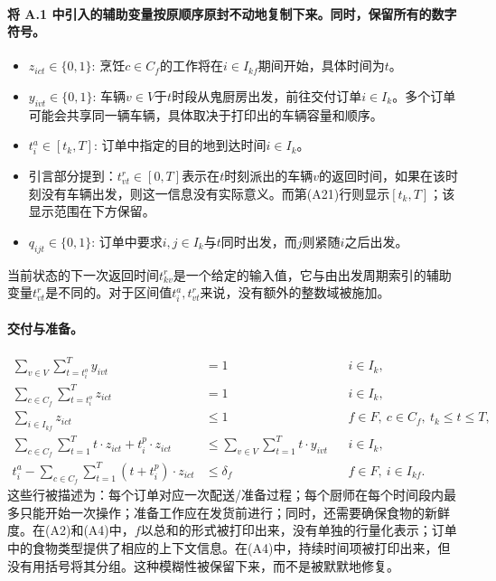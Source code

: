 \documentclass{article}
\begin{document}
\paragraph{将 A.1 中引入的辅助变量按原顺序原封不动地复制下来。同时，保留所有的数字符号。}
\begin{itemize}
\item \(z_{ict}\in\{0,1\}\): 烹饪\(c\in C_f\)的工作将在\(i\in I_{kf}\)期间开始，具体时间为\(t\)。
\item \(y_{ivt}\in\{0,1\}\): 车辆\(v\in V\)于\(t\)时段从鬼厨房出发，前往交付订单\(i\in I_k\)。多个订单可能会共享同一辆车辆，具体取决于打印出的车辆容量和顺序。
\item \(t_i^a\in[t_k,T]\): 订单中指定的目的地到达时间\(i\in I_k\)。
\item 引言部分提到：\(t_{vt}^r\in[0,T]\)表示在\(t\)时刻派出的车辆\(v\)的返回时间，如果在该时刻没有车辆出发，则这一信息没有实际意义。而第(A21)行则显示\([t_k,T]\)；该显示范围在下方保留。
\item \(q_{ijt}\in\{0,1\}\): 订单中要求\(i,j\in I_k\)与\(t\)同时出发，而\(j\)则紧随\(i\)之后出发。
\end{itemize}
当前状态的下一次返回时间\(t_{kv}^r\)是一个给定的输入值，它与由出发周期索引的辅助变量\(t_{vt}^r\)是不同的。对于区间值\(t_i^a,t_{vt}^r\)来说，没有额外的整数域被施加。

\paragraph{交付与准备。}
\begin{align}
\sum_{v\in V}\sum_{t=t_i^o}^{T}y_{ivt}
 &=1 &&i\in I_k, \tag{A1}\\
\sum_{c\in C_f}\sum_{t=t_i^o}^{T}z_{ict}
 &=1 &&i\in I_k, \tag{A2}\\
\sum_{i\in I_{kf}}z_{ict}
 &\leq 1 &&f\in F,\ c\in C_f,\ t_k\leq t\leq T, \tag{A3}\\
\sum_{c\in C_f}\sum_{t=1}^{T}t\cdot z_{ict}
   +t_i^p\cdot z_{ict}
 &\leq \sum_{v\in V}\sum_{t=1}^{T}t\cdot y_{ivt}
 &&i\in I_k, \tag{A4}\\
t_i^a-\sum_{c\in C_f}\sum_{t=1}^{T}(t+t_i^p)\cdot z_{ict}
 &\leq \delta_f &&f\in F,\ i\in I_{kf}. \tag{A5}
\end{align}
这些行被描述为：每个订单对应一次配送/准备过程；每个厨师在每个时间段内最多只能开始一次操作；准备工作应在发货前进行；同时，还需要确保食物的新鲜度。在(A2)和(A4)中，\(f\)以总和的形式被打印出来，没有单独的行量化表示；订单中的食物类型提供了相应的上下文信息。在(A4)中，持续时间项被打印出来，但没有用括号将其分组。这种模糊性被保留下来，而不是被默默地修复。
\end{document}
